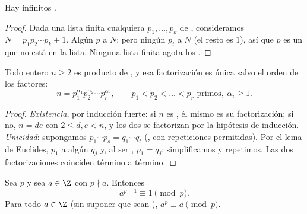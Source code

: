 \begin{theorem}[Euclides]\label{thm:g12:arith:infiniteprimes}
Hay infinitos .
\end{theorem}

\begin{proof}
Dada una lista finita cualquiera $p_1, \dots, p_k$ de , consideramos
$N = p_1 p_2 \cdots p_k + 1$. Algún  $p$  a $N$; pero ningún
$p_i$  a $N$ (el resto es $1$), así que $p$ es un  que no está en
la lista. Ninguna lista finita agota los .
\end{proof}

\begin{theorem}\label{thm:g12:arith:fta}
Todo entero $n \geq 2$ es producto de , y esa factorización es única
salvo el orden de los factores:
\[
n = p_1^{\alpha_1} p_2^{\alpha_2} \cdots p_r^{\alpha_r},
\qquad p_1 < p_2 < \dots < p_r \text{ primos},\ \alpha_i \geq 1 .
\]
\end{theorem}

\begin{proof}
\emph{Existencia}, por inducción fuerte: si $n$ es , él mismo es su
factorización; si no, $n = de$ con $2 \leq d, e < n$, y los dos se
factorizan por la hipótesis de inducción. \emph{Unicidad}: supongamos
$p_1\cdots p_s = q_1 \cdots q_t$ (, con repeticiones permitidas). Por
el lema de Euclides, $p_1$  a algún $q_j$ y, al ser ,
$p_1 = q_j$; simplificamos y repetimos. Las dos factorizaciones coinciden
término a término.
\end{proof}

\begin{theorem}\label{thm:g12:arith:fermat}
Sea $p$  y sea $a \in \Z$ con $p \nmid a$. Entonces
\[
a^{p-1} \equiv 1 \pmod p .
\]
Para todo $a \in \Z$ (sin suponer que sean ),
$a^p \equiv a \pmod p$.
\end{theorem}

